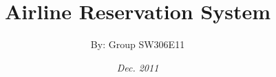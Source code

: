 \title{Airline Reservation System}
\author{By: Group SW306E11}
\date{\emph{Dec. 2011}}
\maketitle
\newpage